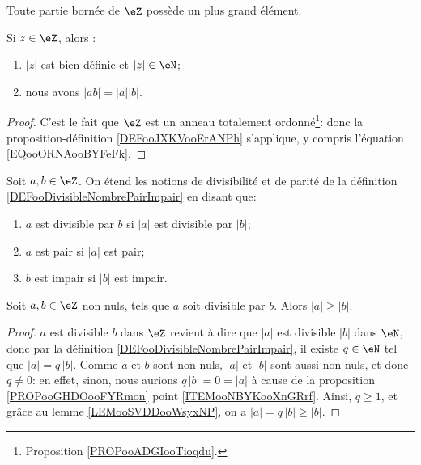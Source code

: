 \begin{lemma}       \label{LEMooMYEIooNFwNVI}
	Toute partie bornée de \( \eZ\) possède un plus grand élément.
\end{lemma}

\begin{proposition}	\label{PROPooRelatifsValAbs}
	Si \( z \in \eZ \), alors :
	\begin{enumerate}
		\item
		      \( |z| \) est bien définie et \( |z| \in \eN \);
		\item
		      nous avons \( | ab |=| a || b | \).
	\end{enumerate}
\end{proposition}

\begin{proof}
	C'est le fait que \( \eZ\) est un anneau totalement ordonné\footnote{Proposition \ref{PROPooADGIooTioqdu}.}: donc la proposition-définition \ref{DEFooJXKVooErANPh} s'applique, y compris l'équation \eqref{EQooORNAooBYFeFk}.
\end{proof}


\begin{definition}	\label{DEFooRelatifsDiviseurParite}
Soit \( a, b \in \eZ \). On étend les notions de divisibilité et de parité de la définition \ref{DEFooDivisibleNombrePairImpair} en disant que:
\begin{enumerate}
\item
\( a \) est divisible par \( b \) si \( |a| \) est divisible par \( |b| \);
\item
\( a \) est pair si \( |a| \) est pair;
\item
\( b \) est impair si \( |b| \) est impair.
\end{enumerate}
\end{definition}

\begin{proposition} \label{PROPooYJBMooZrzkNX}
	Soit \( a,b\in \eZ\) non nuls, tels que \( a\) soit divisible par \( b\). Alors \( | a |\geq | b |\).
\end{proposition}

\begin{proof}
	\( a\) est divisible \( b\) dans \( \eZ \) revient à dire que \( |a| \) est divisible \( |b| \) dans \( \eN \), donc par la définition \ref{DEFooDivisibleNombrePairImpair}, il existe \( q \in \eN \) tel que \( |a| = q\, |b| \). Comme \( a \) et \( b \) sont non nuls, \( |a| \) et \( |b| \) sont aussi non nuls, et donc \( q \neq 0 \): en effet, sinon, nous aurions \( q\, |b| = 0 = |a| \) à cause de la proposition \ref{PROPooGHDOooFYRmon} point \ref{ITEMooNBYKooXnGRrf}. Ainsi, \( q \geq 1 \), et grâce au lemme \ref{LEMooSVDDooWsyxNP}, on a \(|a| = q\, |b| \geq |b| \).
\end{proof}

